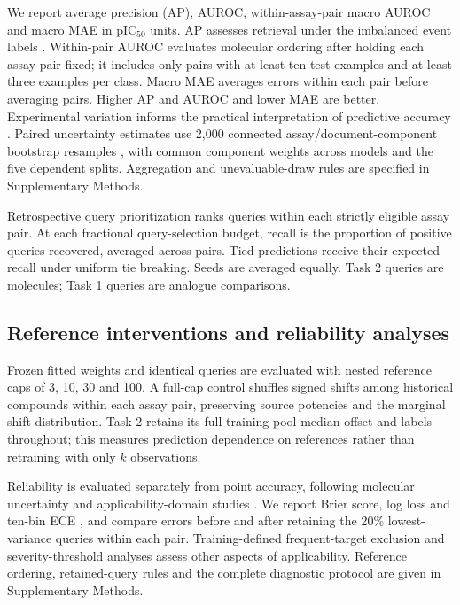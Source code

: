 \documentclass[letterpaper]{article}
\begin{document}
We report average precision (AP), AUROC, within-assay-pair macro AUROC and macro MAE in pIC$_{50}$ units. AP assesses retrieval under the imbalanced event labels \citep{davis2006pr,saito2015pr}. Within-pair AUROC evaluates molecular ordering after holding each assay pair fixed; it includes only pairs with at least ten test examples and at least three examples per class. Macro MAE averages errors within each pair before averaging pairs. Higher AP and AUROC and lower MAE are better. Experimental variation informs the practical interpretation of predictive accuracy \citep{brown2009skepticism}. Paired uncertainty estimates use 2,000 connected assay/document-component bootstrap resamples \citep{efron1979bootstrap}, with common component weights across models and the five dependent splits. Aggregation and unevaluable-draw rules are specified in Supplementary Methods.

Retrospective query prioritization ranks queries within each strictly eligible assay pair. At each fractional query-selection budget, recall is the proportion of positive queries recovered, averaged across pairs. Tied predictions receive their expected recall under uniform tie breaking. Seeds are averaged equally. Task 2 queries are molecules; Task 1 queries are analogue comparisons.

\subsection{Reference interventions and reliability analyses}

Frozen fitted weights and identical queries are evaluated with nested reference caps of 3, 10, 30 and 100. A full-cap control shuffles signed shifts among historical compounds within each assay pair, preserving source potencies and the marginal shift distribution. Task 2 retains its full-training-pool median offset and labels throughout; this measures prediction dependence on references rather than retraining with only $k$ observations.

Reliability is evaluated separately from point accuracy, following molecular uncertainty and applicability-domain studies \citep{scalia2020uncertainty,liu2019domain,norinder2014conformal,kuleshov2018calibration}. We report Brier score, log loss and ten-bin ECE \citep{gneiting2007scores,guo2017calibration}, and compare errors before and after retaining the 20\% lowest-variance queries within each pair. Training-defined frequent-target exclusion and severity-threshold analyses assess other aspects of applicability. Reference ordering, retained-query rules and the complete diagnostic protocol are given in Supplementary Methods.
\end{document}
